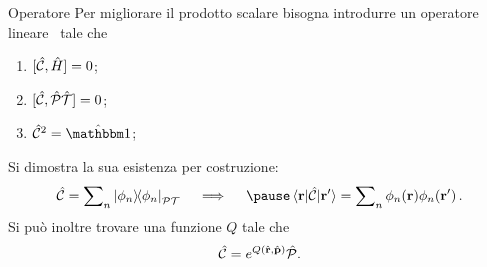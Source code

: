 \begin{frame}{Operatore \hC}
    Per migliorare il prodotto scalare bisogna introdurre un operatore lineare \hC\ tale che
    \begin{enumerate}[label=\mybullet]
        \pause
        \item $\comm*{\hC}{\hH}\! = 0$;
        \pause
        \item $\comm*{\hC}{\hPT}\! = 0$;
        \pause
        \item $\hC^2 = \hidM$;
    \end{enumerate}
    \pause
    Si dimostra la sua esistenza per costruzione:
    \begin{equation*}
        \hC = \sum\nolimits_n\dyad{\phi_n}{\phi_n}_{\PT}
        \quad\implies\quad\pause
        \mel*{\vb{r}}{\hC}{\vb{r'}} = \sum\nolimits_n \phi_n\pqty{\vb{r}}\phi_n\pqty*{\vb{r}'}
        \myperiod
    \end{equation*}
    \pause
    Si può inoltre trovare una funzione $Q$ tale che
    \begin{equation*}
        \hC = \myexp{Q\pqty{\hvr,\hvp}}\hP
        \myperiod
    \end{equation*}
\end{frame}




